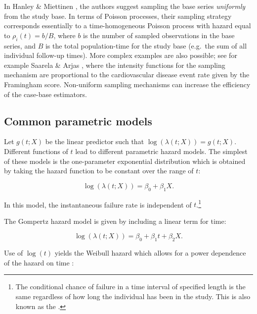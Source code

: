 In Hanley \& Miettinen \citeyearpar{hanley2009fitting}, the authors
suggest sampling the base series \emph{uniformly} from the study base.
In terms of Poisson processes, their sampling strategy corresponds
essentially to a time-homogeneous Poisson process with hazard equal to
\(\rho_i(t) = b/B\), where \(b\) is the number of sampled observations
in the base series, and \(B\) is the total population-time for the study
base (e.g.~the sum of all individual follow-up times). More complex
examples are also possible; see for example Saarela \& Arjas
\citeyearpar{saarela2015non}, where the intensity functions for the
sampling mechanism are proportional to the cardiovascular disease event
rate given by the Framingham score. Non-uniform sampling mechanisms can
increase the efficiency of the case-base estimators.

\hypertarget{common-parametric-models}{%
\subsection{Common parametric models}\label{common-parametric-models}}

Let \(g(t; X)\) be the linear predictor such that
\(\log(\lambda(t;X)) = g(t; X)\). Different functions of \(t\) lead to
different parametric hazard models. The simplest of these models is the
one-parameter exponential distribution which is obtained by taking the
hazard function to be constant over the range of \(t\):

\begin{equation}
\log(\lambda(t; X)) = \beta_0 + \beta_1 X. \label{eq:exp}
\end{equation}

In this model, the instantaneous failure rate is independent of
\(t\).\footnote{The conditional chance of failure in a time interval of specified length is the same regardless of how long the individual has been in the study. This is also known as the  \citep{kalbfleisch2011statistical}.}

The Gompertz hazard model is given by including a linear term for time:

\begin{equation}
\log(\lambda(t; X)) = \beta_0 + \beta_1 t + \beta_2 X. \label{eq:gomp}
\end{equation}

Use of \(\log(t)\) yields the Weibull hazard which allows for a power
dependence of the hazard on time \citep{kalbfleisch2011statistical}:

